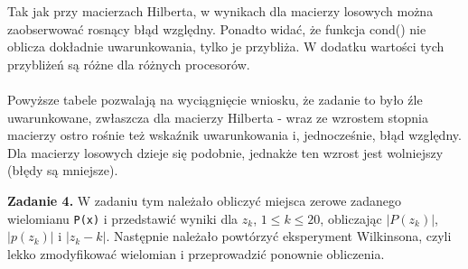 \documentclass[15pt, a4paper]{article}
\begin{document}
\vspace{0.5cm}

\noindent Tak jak przy macierzach Hilberta, w wynikach dla macierzy losowych można zaobserwować rosnący błąd względny. Ponadto widać, że funkcja cond() nie oblicza dokładnie uwarunkowania, tylko je przybliża. W dodatku wartości tych przybliżeń są różne dla różnych procesorów. \\\\
\noindent Powyższe tabele pozwalają na wyciągnięcie wniosku, że zadanie to było źle uwarunkowane, zwłaszcza dla macierzy Hilberta - wraz ze wzrostem stopnia macierzy ostro rośnie też wskaźnik uwarunkowania i, jednocześnie, błąd względny. Dla macierzy losowych dzieje się podobnie, jednakże ten wzrost jest wolniejszy (błędy są mniejsze).

\vspace{0.5cm}

\pagebreak

\noindent\hrulefill


\vspace{0.5cm}

\noindent\textbf{Zadanie 4.} W zadaniu tym należało obliczyć miejsca zerowe zadanego wielomianu \verb|P(x)| i przedstawić wyniki dla \( z_k \), \( 1 \leq k \leq 20 \), obliczając \( |P(z_k)| \), \( |p(z_k)| \) i \( |z_k - k| \). Następnie należało powtórzyć eksperyment Wilkinsona, czyli lekko zmodyfikować wielomian i przeprowadzić ponownie obliczenia.

\vspace{0.5cm}
\end{document}
